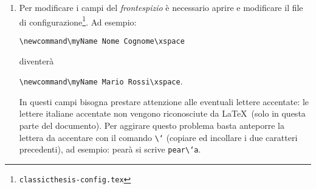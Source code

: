 \documentclass[paper=a4, fontsize=11pt]{scrartcl}	%
\numberwithin{equation}{section}		%
\numberwithin{figure}{section}			%
\numberwithin{table}{section}				%
\begin{document}
\begin{enumerate}
N.B.2: In alcune citazioni BiBTex non vengono rispettate le lettere maiuscole. 
Se si osserva l'esempio di bibliografia nel file \texttt{Bibliography.bib}, si nota che il \emph{title} e il \emph{booktitle} della prima citazione ha tutte le lettere maiuscole circondate da parentesi graffe. 
Ci\`o \`e indispensabile affinch\'e vengano stampate in maiuscolo anche nel file pdf finale.

\item Per modificare i campi del \emph{frontespizio} \`e necessario aprire e modificare il file di configurazione\footnote{ \texttt{classicthesis-config.tex}}.
Ad esempio: 


\texttt{\textbackslash newcommand{\textbackslash myName}{ Nome Cognome\textbackslash xspace}}


diventer\`a


\texttt{\textbackslash newcommand{\textbackslash myName}{ Mario Rossi\textbackslash xspace}}.


In questi campi bisogna prestare attenzione alle eventuali lettere accentate: le lettere italiane accentate non vengono riconosciute da \LaTeX\ (solo in questa parte del documento). 
Per aggirare questo problema basta anteporre la lettera da accentare con il comando \texttt{\textbackslash `} (copiare ed incollare i due caratteri precedenti), ad esempio: pear\`a si scrive \texttt{pear\textbackslash `a}.
\end{enumerate}
\end{document}
